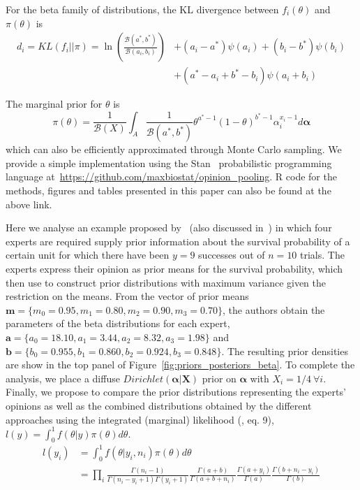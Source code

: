 \documentclass[a4paper, notitlepage, 11pt]{article}
\begin{document}
For the beta family of distributions, the KL divergence between $f_i(\theta)$ and $\pi(\theta)$ is
\begin{equation}
\begin{split}
 \label{eq:KLbeta}
 d_i = KL(f_i||\pi) = \ln\left(\frac{\mathcal{B}(a^*, b^*)}{\mathcal{B}(a_i, 
b_i)}\right) &+ (a_i-a^*)\psi(a_i)+ (b_i-b^*)\psi(b_i) \\
 &+ (a^*-a_i + b^* - b_i)\psi(a_i+b_i)
\end{split}
 \end{equation}

The marginal prior for $\theta$ is
\begin{equation}
\label{eq:marginalbeta}
\pi(\theta) = \frac{1}{\mathcal{B}(X)}\int_{A} \frac{1}{\mathcal{B}(a^*, b^*)} \theta^{a^* -1}(1-\theta)^{b^* -1}\alpha_i^{x_i-1}d\boldsymbol\alpha 
\end{equation}
which can also be efficiently approximated through Monte Carlo sampling.
We provide a simple implementation using the Stan~\citep{stan2014} probabilistic programming language at~\url{https://github.com/maxbiostat/opinion_pooling}.
R code for the methods, figures and tables presented in this paper can also be found at the above link.

Here we analyse an example proposed by~\cite{savchuk1994} (also discussed in~\cite{rufo2012B}) in which four experts are required supply prior information about the survival probability of a certain unit for which there have been $y = 9$ successes out of $n = 10$ trials.
The experts express their opinion as prior means for the survival probability, which~\cite{savchuk1994} then use to construct prior distributions with maximum variance given the restriction on the means.
From the vector of prior means $\mathbf{m} = \{ m_0 = 0.95, m_1 = 0.80, m_2 = 0.90, m_3 = 0.70 \}$, the authors obtain the parameters of the beta distributions for each expert,  $\mathbf{a} = \{ a_0 = 18.10, a_1 = 3.44 , a_2 = 8.32, a_3 = 1.98 \}$ and  $\mathbf{b} = \{ b_0 = 0.955 , b_1 = 0.860, b_2 = 0.924, b_3 = 0.848\}$.
The resulting prior densities are show in the top panel of Figure~\ref{fig:priors_posteriors_beta}.
To complete the analysis, we place a diffuse $Dirichlet(\boldsymbol\alpha | \boldsymbol X)$ prior on $\boldsymbol\alpha$ with $X_i = 1/4 \: \forall i$.
Finally, we propose to compare the prior distributions representing the experts' opinions as well as the combined distributions obtained by the different approaches using the integrated (marginal) likelihood (\cite{raftery2007}, eq. 9), $l(y) = \int_{0}^{1}f(\theta|y)\pi(\theta)d\theta$.
\begin{align}
 \label{eq:marglike}
 l(y_i) &= \int_{0}^{1}f(\theta|y_i, n_i)\pi(\theta)d\theta\nonumber\\
      &= \prod_{i}\frac{\Gamma(n_i-1)}{\Gamma(n_i-y_i + 1)\Gamma(y_i+1)}\frac{\Gamma(a +b)}{\Gamma(a +b + n_i)}\frac{\Gamma(a + y_i)}{\Gamma(a)}\frac{\Gamma(b + n_i - y_i) }{\Gamma(b)}
\end{align}
\end{document}
